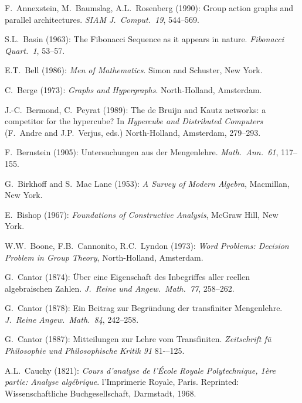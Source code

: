 
\begin{thebibliography}{999}


F.~Annexstein, M.~Baumslag, A.L.~Rosenberg (1990):
Group action graphs and parallel architectures.
{\it SIAM J.~Comput.~19}, 544--569.


S.L.~Basin (1963): The Fibonacci Sequence as it appears in nature.
{\it Fibonacci Quart.~1}, 53--57.

E.T.~Bell (1986):
{\it Men of Mathematics}.
Simon and Schuster, New York.

C.~Berge (1973):
{\it Graphs and Hypergraphs}.
North-Holland, Amsterdam.

J.-C.~Bermond, C.~Peyrat (1989):
The de Bruijn and Kautz networks: a competitor for the hypercube?
In {\it Hypercube and Distributed Computers} (F.~Andre and
J.P.~Verjus, eds.)  North-Holland, Amsterdam, 279--293.

F.~Bernstein (1905): Untersuchungen aus der Mengenlehre. {\it
Math.~Ann.~61}, 117--155.

G.~Birkhoff and S.~Mac Lane (1953): {\it A Survey of Modern Algebra},
Macmillan, New York.

E.~Bishop (1967): {\it Foundations of Constructive Analysis},
McGraw Hill, New York.

W.W.~Boone, F.B.~Cannonito, R.C.~Lyndon (1973):
{\it Word Problems: Decision Problem in Group Theory}, North-Holland,
Amsterdam.



G.~Cantor (1874): \"{U}ber eine Eigenschaft des Inbegriffes aller
reellen algebraischen Zahlen.  {\it J.~Reine und Angew.~Math.~77},
258--262.

G.~Cantor (1878): Ein Beitrag zur Begr\"{u}ndung der transfiniter
Mengenlehre.  {\it J.~Reine Angew.~Math.~84}, 242--258.

G.~Cantor (1887): Mitteilungen zur Lehre vom Transfiniten.
{\it Zeitschrift f\"{u} Philosophie und Philosophische Kritik 91}
81-–125.

A.L.~Cauchy (1821): {\it Cours d'analyse de l'\'{E}cole Royale
Polytechnique, 1\`{e}re partie: Analyse alg\'{e}brique}.
l'Imprimerie Royale, Paris.  Reprinted: Wissenschaftliche
Buchgesellschaft, Darmstadt, 1968.


\end{thebibliography}
